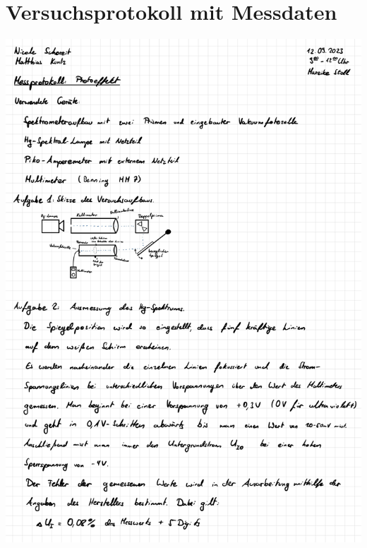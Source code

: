 \documentclass{article}
\begin{document}
\newpage
\newpage

\section{Versuchsprotokoll mit Messdaten}

\includegraphics[width=\textwidth]{graphics/mess1.jpg}
\newpage
\end{document}
